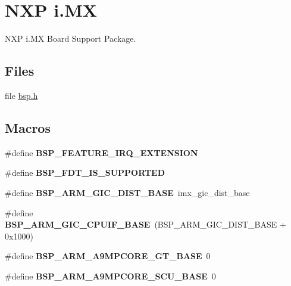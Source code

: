 \hypertarget{group__RTEMSBSPsARMimx}{}\section{N\+XP i.\+MX}
\label{group__RTEMSBSPsARMimx}


N\+XP i.\+MX Board Support Package.  


\subsection*{Files}
\begin{DoxyCompactItemize}
\item 
file \mbox{\hyperlink{bsps_2arm_2imx_2include_2bsp_8h}{bsp.\+h}}
\end{DoxyCompactItemize}
\subsection*{Macros}
\begin{DoxyCompactItemize}
\item 
\mbox{\label{group__RTEMSBSPsARMimx_ga5d7d631d3a14b7554160f14eb42f351b}} 
\#define {\bfseries B\+S\+P\+\_\+\+F\+E\+A\+T\+U\+R\+E\+\_\+\+I\+R\+Q\+\_\+\+E\+X\+T\+E\+N\+S\+I\+ON}
\item 
\mbox{\label{group__RTEMSBSPsARMimx_gaa5b7b5182d829e65400cf5cb27253ad8}} 
\#define {\bfseries B\+S\+P\+\_\+\+F\+D\+T\+\_\+\+I\+S\+\_\+\+S\+U\+P\+P\+O\+R\+T\+ED}
\item 
\mbox{\label{group__RTEMSBSPsARMimx_ga74b3234f20bb7c846a4b35c68bbb0703}} 
\#define {\bfseries B\+S\+P\+\_\+\+A\+R\+M\+\_\+\+G\+I\+C\+\_\+\+D\+I\+S\+T\+\_\+\+B\+A\+SE}~imx\+\_\+gic\+\_\+dist\+\_\+base
\item 
\mbox{\label{group__RTEMSBSPsARMimx_ga82979270e5d617859b19ad1830434bb6}} 
\#define {\bfseries B\+S\+P\+\_\+\+A\+R\+M\+\_\+\+G\+I\+C\+\_\+\+C\+P\+U\+I\+F\+\_\+\+B\+A\+SE}~(B\+S\+P\+\_\+\+A\+R\+M\+\_\+\+G\+I\+C\+\_\+\+D\+I\+S\+T\+\_\+\+B\+A\+SE + 0x1000)
\item 
\mbox{\label{group__RTEMSBSPsARMimx_gafdfd032028e40b1b0e2fcdbcebf24250}} 
\#define {\bfseries B\+S\+P\+\_\+\+A\+R\+M\+\_\+\+A9\+M\+P\+C\+O\+R\+E\+\_\+\+G\+T\+\_\+\+B\+A\+SE}~0
\item 
\mbox{\label{group__RTEMSBSPsARMimx_ga180004170c65ed2eaa91050be70aa480}} 
\#define {\bfseries B\+S\+P\+\_\+\+A\+R\+M\+\_\+\+A9\+M\+P\+C\+O\+R\+E\+\_\+\+S\+C\+U\+\_\+\+B\+A\+SE}~0
\end{DoxyCompactItemize}
